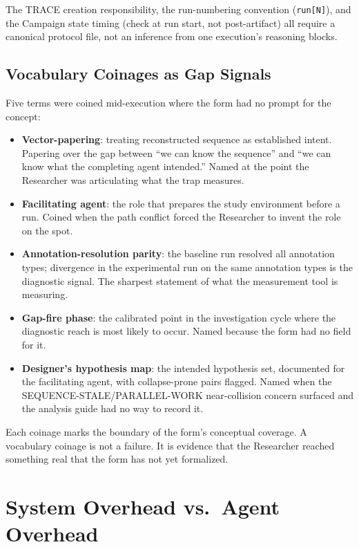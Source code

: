 \documentclass[11pt,a4paper]{article}
\begin{document}
The TRACE creation responsibility, the run-numbering convention
(\texttt{run[N]}), and the Campaign state timing (check at run start, not
post-artifact) all require a canonical protocol file, not an inference from one
execution's reasoning blocks.

\subsection{Vocabulary Coinages as Gap Signals}
\label{sec:coinages}

Five terms were coined mid-execution where the form had no prompt for the
concept:

\begin{itemize}
  \item \textbf{Vector-papering}: treating reconstructed sequence as
    established intent. Papering over the gap between ``we can know the
    sequence'' and ``we can know what the completing agent intended.'' Named at
    the point the Researcher was articulating what the trap measures.
  \item \textbf{Facilitating agent}: the role that prepares the study
    environment before a run. Coined when the path conflict forced the
    Researcher to invent the role on the spot.
  \item \textbf{Annotation-resolution parity}: the baseline run resolved all
    annotation types; divergence in the experimental run on the same annotation
    types is the diagnostic signal. The sharpest statement of what the
    measurement tool is measuring.
  \item \textbf{Gap-fire phase}: the calibrated point in the investigation
    cycle where the diagnostic reach is most likely to occur. Named because the
    form had no field for it.
  \item \textbf{Designer's hypothesis map}: the intended hypothesis set,
    documented for the facilitating agent, with collapse-prone pairs flagged.
    Named when the SEQUENCE-STALE/PARALLEL-WORK near-collision concern surfaced
    and the analysis guide had no way to record it.
\end{itemize}

Each coinage marks the boundary of the form's conceptual coverage. A
vocabulary coinage is not a failure. It is evidence that the Researcher reached
something real that the form has not yet formalized.

\section{System Overhead vs.\ Agent Overhead}
\end{document}
